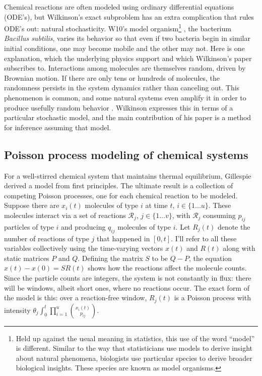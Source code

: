 \documentclass{article}
\begin{document}
Chemical reactions are often modeled using ordinary differential equations (ODE's), but Wilkinson's exact subproblem has an extra complication that rules ODE's out: natural stochasticity. W10's model organism\footnote{Held up against the usual meaning in statistics, this use of the word ``model'' is different. Similar to the way that statisticians use models to derive insight about natural phenomena, biologists use particular species to derive broader biological insights. These species are known as model organisms.}
, the bacterium {\it Bacillus subtilis}, varies its behavior so that even if two bacteria begin in similar initial conditions, one may become mobile and the other may not. Here is one explanation, which the underlying physics support and which  Wilkinson's paper subscribes to. Interactions among molecules are themselves random, driven by Brownian motion. If there are only tens or hundreds of molecules, the randomness persists in the system dynamics rather than canceling out. This phenomenon is common, and some natural systems even amplify it in order to produce usefully random behavior \cite{reinker2006parameter}. Wilkinson expresses this in terms of a particular stochastic model, and the main contribution of his paper is a method for inference assuming that model.
 

\subsection{Poisson process modeling of chemical systems}

For a well-stirred chemical system that maintains thermal equilibrium, Gillespie  \cite{gillespie1992rigorous} derived a model from first principles. The ultimate result is a collection of competing Poisson processes, one for each chemical reaction to be modeled. Suppose there are $x_{i}(t)$ molecules of type $i$ at time $t$, $i\in \{1 ... u\}$. These molecules interact via a set of reactions $\mathcal{R}_{j}$, $j\in \{1 ... v\}$, with $\mathcal{R}_{j}$ consuming $p_{ij}$ particles of type $i$ and producing $q_{ij}$ molecules of type $i$. Let $R_{j}(t)$ denote the number of reactions of type $j$ that happened in $[0,t]$. I'll refer to all these variables collectively using the time-varying vectors $x(t)$ and $R(t)$ along with static matrices $P$ and $Q$. Defining the matrix $S$ to be $Q-P$, the equation $x(t) - x(0) = SR(t)$ shows how the reactions affect the molecule counts. Since the particle counts are integers, the system is not constantly in flux: there will be windows, albeit short ones, where no reactions occur. The exact form of the model is this: over a reaction-free window, $R_{j}(t)$ is a Poisson process with intensity $\theta_{j}\int_0^t \prod_{i=1}^u {{x_i(t)}\choose{p_{ij}}}$. 
\end{document}
